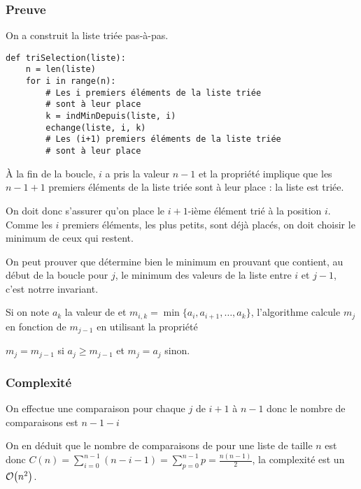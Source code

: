 \subsubsection{Preuve} On a construit la liste triée pas-à-pas.
\begin{lstlisting}
def triSelection(liste):
    n = len(liste)
    for i in range(n):
        # Les i premiers éléments de la liste triée
        # sont à leur place
        k = indMinDepuis(liste, i)
        echange(liste, i, k)
        # Les (i+1) premiers éléments de la liste triée
        # sont à leur place
\end{lstlisting}
À la fin de la boucle, $i$ a pris la valeur $n-1$ et la propriété implique que les $n-1+1$ premiers éléments de la liste triée sont à leur place : la liste est triée.

On doit donc s'assurer qu'on place le $i+1$-ième élément trié à la position $i$. Comme les $i$ premiers éléments, les plus petits, sont déjà placés, on doit choisir le minimum de ceux qui restent.

On peut prouver que  détermine bien le minimum en prouvant que  contient, au début de la boucle pour $j$, le minimum des valeurs de la liste entre $i$ et $j-1$, c'est notrre invariant.

\medskip
Si on note $a_k$ la valeur de  et $m_{i, k} = \min\{a_i, a_{i+1}, \ldots, a_k\}$, l'algorithme calcule $m_j$ en fonction de $m_{j-1}$ en utilisant la propriété

$m_{j} = m_{j-1}$ si $a_j \ge m_{j-1}$ et $m_j= a_j$ sinon.

\subsubsection{Complexité} On effectue une comparaison pour chaque $j$ de $i+1$ à $n-1$ donc le nombre de comparaisons est $n-1-i$

On en déduit que le nombre de comparaisons de  pour une liste de taille $n$  est donc
$\displaystyle C(n)=\sum_{i=0}^{n-1} (n-i-1)=\sum_{p=0}^{n-1} p = \frac{n(n-1)}2$, la complexité est un ${\cal O}\bigl(n^2\bigr)$. 

